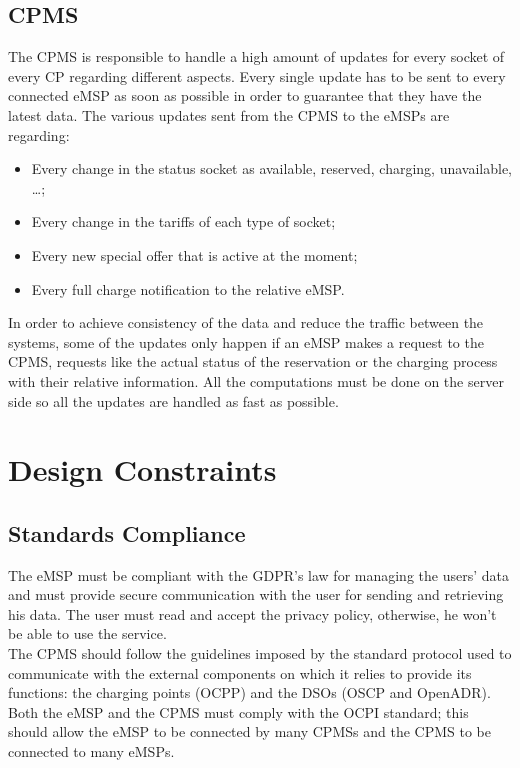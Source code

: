 \documentclass{Configuration_Files/PoliMi3i_thesis}
\begin{document}
\subsection{CPMS}
The CPMS is responsible to handle a high amount of updates for every socket of every CP regarding different aspects.
Every single update has to be sent to every connected eMSP as soon as possible in order to guarantee that they have the latest data.
The various updates sent from the CPMS to the eMSPs are regarding:
\begin{itemize}
    \item Every change in the status socket as available, reserved, charging, unavailable, …;
    \item Every change in the tariffs of each type of socket;
    \item Every new special offer that is active at the moment;
    \item Every full charge notification to the relative eMSP.
\end{itemize}
In order to achieve consistency of the data and reduce the traffic between the systems, some of the updates only happen if an eMSP makes a request to the CPMS, requests like the actual status of the reservation or the charging process with their relative information.
All the computations must be done on the server side so all the updates are handled as fast as possible.

\section{Design Constraints}

\subsection{Standards Compliance}

The eMSP must be compliant with the GDPR's law for managing the users' data and must provide secure communication with the user for sending and retrieving his data. The user must read and accept the privacy policy, otherwise, he won't be able to use the service.\\
The CPMS should follow the guidelines imposed by the standard protocol used to communicate with the external components on which it relies to provide its functions: the charging points (OCPP) and the DSOs (OSCP and OpenADR).\\
Both the eMSP and the CPMS must comply with the OCPI standard; this should allow the eMSP to be connected by many CPMSs and the CPMS to be connected to many eMSPs.
\end{document}
